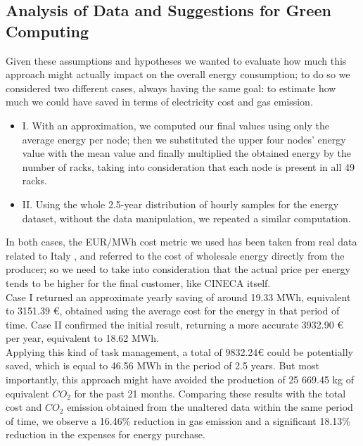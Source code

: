 \subsection{Analysis of Data and Suggestions for Green Computing}
Given these assumptions and hypotheses we wanted to evaluate how much this approach might actually impact on the overall energy consumption; to do so we considered two different cases, always having the same goal: to estimate how much we could have saved in terms of electricity cost and gas emission.
\begin{itemize}
  \item I. With an approximation, we computed our final values using only the average energy per node; then we substituted the upper four nodes’ energy value with the mean value and finally multiplied the obtained energy by the number of racks, taking into consideration that each node is present in all 49 racks.
  \item II. Using the whole 2.5-year distribution of hourly samples for the energy dataset, without the data manipulation, we repeated a similar computation.
\end{itemize}
In both cases, the EUR/MWh cost metric we used has been taken from real data related to Italy \cite{ElectricityCost}, and referred to the cost of wholesale energy directly from the producer; so we need to take into consideration that the actual price per energy tends to be higher for the final customer, like CINECA itself.
\\
Case I returned an approximate yearly saving of around 19.33 MWh, equivalent to 3151.39 €, obtained using the average cost for the energy in that period of time. Case II confirmed the initial result, returning a more accurate 3932.90 € per year, equivalent to 18.62 MWh.
\\
Applying this kind of task management, a total of 9832.24€ could be potentially saved, which is equal to 46.56 MWh in the period of 2.5 years.
But most importantly, this approach might have avoided the production of 25 669.45 kg of equivalent $CO_2$ for the past 21 months.
Comparing these results with the total cost and $CO_2$ emission obtained from the unaltered data within the same period of time, we observe a 16.46\% reduction in gas emission and a significant 18.13\% reduction in the expenses for energy purchase.